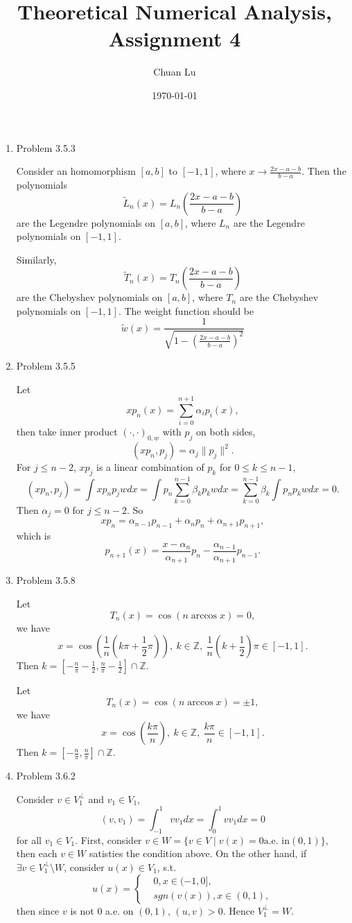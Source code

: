 \documentclass{article}%
\begin{document}
\title{Theoretical Numerical Analysis, Assignment 4}
\author{Chuan Lu}
\date{\today}
\maketitle

\begin{enumerate}

\item Problem 3.5.3

Consider an homomorphism $[a, b]$ to $[-1, 1]$, where $x\to \frac{2x-a-b}{b-a}$. Then the polynomials
$$
\tilde{L}_n(x) = L_n(\frac{2x-a-b}{b-a})
$$
are the Legendre polynomials on $[a, b]$, where $L_n $ are the Legendre polynomials on $[-1, 1]$. 

Similarly, 
$$
\tilde{T}_n(x) = T_n(\frac{2x-a-b}{b-a})
$$
are the Chebyshev polynomials on $[a, b]$, where $T_n $ are the Chebyshev polynomials on $[-1, 1]$. The weight function should be
$$
\tilde{w}(x) = \frac{1}{\sqrt{1-(\frac{2x-a-b}{b-a})^2}}
$$

\item Problem 3.5.5

Let 
$$
xp_n(x) = \sum_{i=0}^{n+1}\alpha_i p_i(x), 
$$
then take inner product $(\cdot, \cdot)_{0, w} $ with $p_j $ on both sides,
$$
(xp_n, p_j) = \alpha_j\lVert p_j\rVert^2.
$$
For $j\le n-2$, $xp_j $ is a linear combination of $p_k$ for $0\le k\le n-1$,
$$
(xp_n, p_j) = \int xp_np_jw dx = \int p_n\sum_{k=0}^{n-1}\beta_k p_kw dx = \sum_{k=0}^{n-1}\beta_k\int p_n p_kwdx = 0.
$$
Then $\alpha_j = 0 $ for $j\le n-2$. So
$$
xp_n = \alpha_{n-1}p_{n-1} + \alpha_{n}p_n +\alpha_{n+1}p_{n+1},
$$
which is 
$$
p_{n+1}(x) = \frac{x-\alpha_n}{\alpha_{n+1}}p_n - \frac{\alpha_{n-1}}{\alpha_{n+1}}p_{n-1}.
$$

\item Problem 3.5.8

Let
$$
T_n(x) = \cos(n\arccos x) = 0,
$$
we have
$$
x = \cos(\frac{1}{n}(k\pi+\frac{1}{2}\pi)), \ k\in \mathbb{Z}, \ \frac{1}{n}(k+\frac{1}{2})\pi \in [-1, 1].
$$
Then $k = [-\frac{n}{\pi}-\frac{1}{2}, \frac{n}{\pi}-\frac{1}{2}]\cap \mathbb{Z}$.

Let
$$
T_n(x) = \cos(n\arccos x) = \pm 1,
$$
we have
$$
x = \cos(\frac{k\pi}{n}), \ k\in\mathbb{Z}, \ \frac{k\pi}{n}\in [-1, 1].
$$
Then
$k = [-\frac{n}{\pi}, \frac{n}{\pi}]\cap \mathbb{Z}$.

\item Problem 3.6.2

Consider $v \in V_1^\perp $ and $v_1\in V_1 $,
$$
(v, v_1) = \int_{-1}^1 v v_1 dx = \int_{0}^1vv_1dx = 0
$$
for all $v_1\in V_1 $. First, consider $v\in W = \{v\in V\mid v(x) = 0 \text{a.e. in} (0, 1) \}$, then each $v\in W$ satisties the condition above. On the other hand, if $\exists v\in V_1^\perp \setminus W $, consider $u(x)\in V_1 $, s.t.
$$
u(x) = \left\{
\begin{aligned}
&0, x\in (-1, 0], \\
&sgn(v(x)), x\in (0, 1),
\end{aligned}
\right.
$$
then since $v$ is not 0 a.e. on $(0, 1)$,
$(u, v) > 0$. Hence $V_1^\perp = W $.


\end{enumerate}
\end{document}

